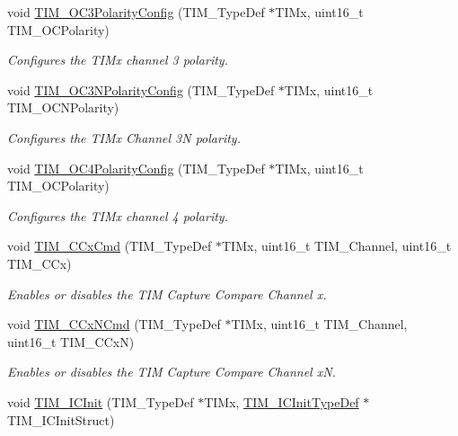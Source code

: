 \begin{DoxyCompactItemize}
void \hyperlink{group___t_i_m_ga1ef43b03fe666495e80aac9741ae7ab0}{T\-I\-M\-\_\-\-O\-C3\-Polarity\-Config} (T\-I\-M\-\_\-\-Type\-Def $\ast$T\-I\-Mx, uint16\-\_\-t T\-I\-M\-\_\-\-O\-C\-Polarity)
\begin{DoxyCompactList}\small\item\em Configures the T\-I\-Mx channel 3 polarity. \end{DoxyCompactList}\item 
void \hyperlink{group___t_i_m_gac710acc5b682e892584fc6f089f61dc2}{T\-I\-M\-\_\-\-O\-C3\-N\-Polarity\-Config} (T\-I\-M\-\_\-\-Type\-Def $\ast$T\-I\-Mx, uint16\-\_\-t T\-I\-M\-\_\-\-O\-C\-N\-Polarity)
\begin{DoxyCompactList}\small\item\em Configures the T\-I\-Mx Channel 3\-N polarity. \end{DoxyCompactList}\item 
void \hyperlink{group___t_i_m_gad678410f7c7244f83daad93ce9d1056e}{T\-I\-M\-\_\-\-O\-C4\-Polarity\-Config} (T\-I\-M\-\_\-\-Type\-Def $\ast$T\-I\-Mx, uint16\-\_\-t T\-I\-M\-\_\-\-O\-C\-Polarity)
\begin{DoxyCompactList}\small\item\em Configures the T\-I\-Mx channel 4 polarity. \end{DoxyCompactList}\item 
void \hyperlink{group___t_i_m_ga3ecc4647d9ede261beb5e0535cf29ebb}{T\-I\-M\-\_\-\-C\-Cx\-Cmd} (T\-I\-M\-\_\-\-Type\-Def $\ast$T\-I\-Mx, uint16\-\_\-t T\-I\-M\-\_\-\-Channel, uint16\-\_\-t T\-I\-M\-\_\-\-C\-Cx)
\begin{DoxyCompactList}\small\item\em Enables or disables the T\-I\-M Capture Compare Channel x. \end{DoxyCompactList}\item 
void \hyperlink{group___t_i_m_ga304ff7c8a1615498da749bf2507e9f2b}{T\-I\-M\-\_\-\-C\-Cx\-N\-Cmd} (T\-I\-M\-\_\-\-Type\-Def $\ast$T\-I\-Mx, uint16\-\_\-t T\-I\-M\-\_\-\-Channel, uint16\-\_\-t T\-I\-M\-\_\-\-C\-Cx\-N)
\begin{DoxyCompactList}\small\item\em Enables or disables the T\-I\-M Capture Compare Channel x\-N. \end{DoxyCompactList}\item 
void \hyperlink{group___t_i_m_ga9e6a153dd6552e4e1188eba227316f7f}{T\-I\-M\-\_\-\-I\-C\-Init} (T\-I\-M\-\_\-\-Type\-Def $\ast$T\-I\-Mx, \hyperlink{struct_t_i_m___i_c_init_type_def}{T\-I\-M\-\_\-\-I\-C\-Init\-Type\-Def} $\ast$T\-I\-M\-\_\-\-I\-C\-Init\-Struct)

\end{DoxyCompactItemize}
